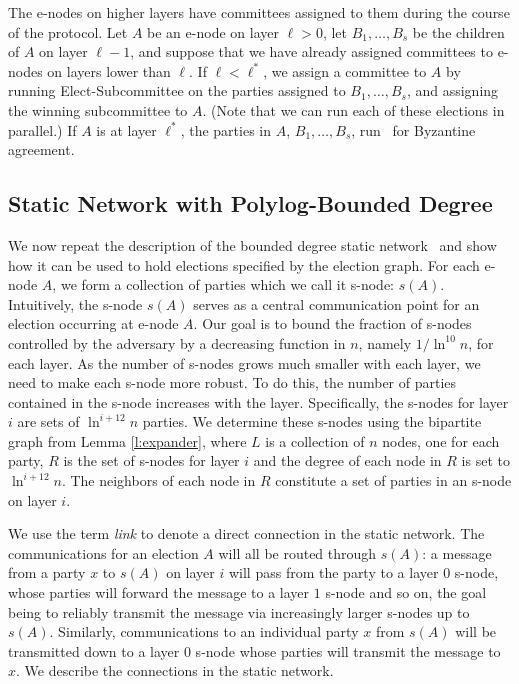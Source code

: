 \documentclass[11pt,letter]{article}
\theoremstyle{mytheoremstyle}
\newcommand{\toplev}{\ell^*}
\newcommand{\lev}{\ell}
\newcommand{\es}{\mbox{\textsf{Elect-Subcommittee}}\xspace}
\begin{document}
The \textsf{e-node}s on higher layers have committees assigned to them during the course of the protocol. Let $A$ be an \textsf{e-node} on layer $\lev>0$, let $B_1,\ldots, B_s$ be the children of $A$ on layer $\lev-1$, and suppose that we have already assigned committees to \textsf{e-node}s on layers lower than $\lev$. If $\lev < \toplev$, we assign a committee to $A$ by running \es on the parties assigned to $B_1,\ldots,B_s$, and assigning the winning subcommittee to $A$. (Note that we can run each of these elections in parallel.)  If $A$ is at layer $\toplev$, the parties in $A$, $B_1,\ldots,B_s$, run \heavyba\ for Byzantine agreement.

\subsection{Static Network with Polylog-Bounded Degree} \label{s: static network}

We now repeat the description of the bounded degree static network~\cite{King:2006:TSS:1170136.1170491} and show how it can be used to hold elections specified by the election graph. For each \textsf{e-node} $A$, we form a collection of parties which we call it \textsf{s-node}: $s(A)$. Intuitively, the \textsf{s-node} $s(A)$ serves as a central communication point for an election occurring at \textsf{e-node} $A$. 
Our goal is to bound the fraction of \textsf{s-node}s controlled by the adversary by a decreasing function in $n$, namely $ 1/\ln^{10} n$, for each layer. As the number of \textsf{s-node}s grows much smaller with each layer, we need to make each \textsf{s-node} more robust. To do this, the number of parties contained in the \textsf{s-node} increases with the layer. Specifically, the \textsf{s-node}s for layer $i$ are sets of $\ln^{i+12} n $ parties. We determine these \textsf{s-node}s using the bipartite graph from Lemma \ref{l:expander}, where $L$ is a collection of $n$ nodes, one for each party, $R$ is the set of \textsf{s-node}s for layer $i$ and the degree of each node in $R$ is set to $\ln^{i+12} n$. The neighbors of each node in $R$ constitute a set of parties in an \textsf{s-node} on layer $i$.

We use the term {\em link} to denote a direct connection in the static network. The communications for an election $A$ will all be routed through $s(A)$: a message from a party $x$ to $s(A)$ on layer $i$ will pass from the party to a layer $0$ \textsf{s-node}, whose parties will forward the message to a layer $1$ \textsf{s-node} and so on, the goal being to reliably transmit the message via increasingly larger \textsf{s-node}s up to $s(A)$.
Similarly, communications to an individual party $x$ from $s(A)$ will be transmitted down to a layer $0$ \textsf{s-node} whose parties will transmit the message to $x$. We describe the connections in the static network.
\end{document}

